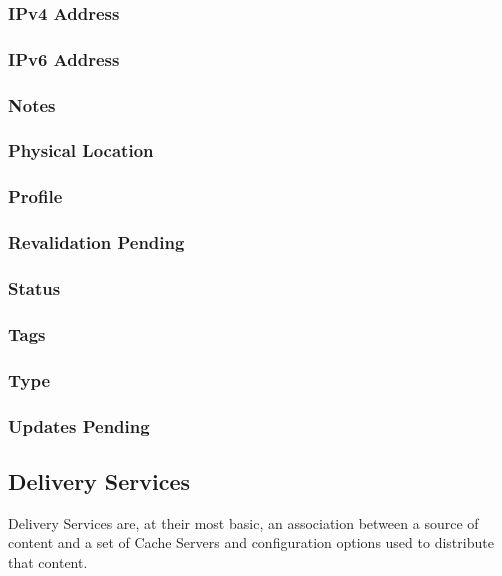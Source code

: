 \subsubsection{IPv4 Address}

\subsubsection{IPv6 Address}

\subsubsection{Notes}

\subsubsection{Physical Location}

\subsubsection{Profile}

\subsubsection{Revalidation Pending}

\subsubsection{Status}

\subsubsection{Tags}

\subsubsection{Type}

\subsubsection{Updates Pending}



\subsection{Delivery Services}
Delivery Services are, at their most basic, an association between a source of
content and a set of Cache Servers and configuration options used to distribute
that content.

